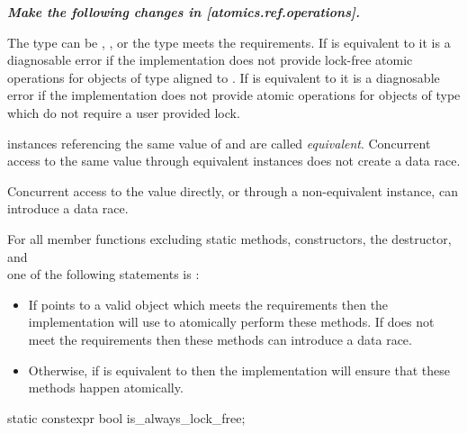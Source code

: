 \textbf{\textit{Make the following changes in [atomics.ref.operations].}} \\

\begin{addedblock}
\pnum
The type  can be ,
, or the type  meets the
 requirements.  
If  is equivalent to  
it is a diagnosable error if the implementation does not provide lock-free atomic
operations for  objects of type  aligned to
.
If  is equivalent to  
it is a diagnosable error if the implementation does not provide atomic
operations for  objects of type  which do not require a user provided
lock.

\pnum
{} instances referencing the same value of  and  are 
called \textit{equivalent}. Concurrent access to the same value through 
equivalent  instances does not create a data race. 
\begin{note} Concurrent access to the value directly, or through a non-equivalent
 instance, can introduce a data race.
\end{note}

\pnum
For all  member functions excluding static methods, constructors, 
the destructor, and \\  one of the following statements is :
\begin{itemize}
\item If  points to a valid  object which meets the 
 requirements then 
the implementation will use  to atomically perform these methods.
If  does not meet the  requirements then 
these methods can introduce a data race.
\item Otherwise, if  is equivalent to  then
the implementation will ensure that these methods happen atomically.
\end{itemize}
\end{addedblock}

\begin{itemdecl}
static constexpr bool is_always_lock_free;
\end{itemdecl}

